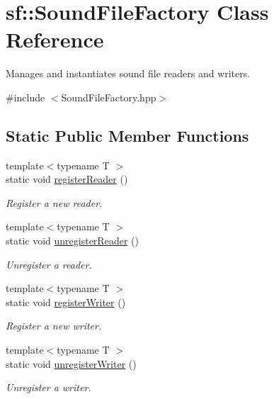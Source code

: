 \hypertarget{classsf_1_1_sound_file_factory}{}\section{sf\+:\+:Sound\+File\+Factory Class Reference}
\label{classsf_1_1_sound_file_factory}


Manages and instantiates sound file readers and writers.  




{\ttfamily \#include $<$Sound\+File\+Factory.\+hpp$>$}

\subsection*{Static Public Member Functions}
\begin{DoxyCompactItemize}
\item 
{\footnotesize template$<$typename T $>$ }\\static void \hyperlink{classsf_1_1_sound_file_factory_acaf1f0bf1b7c7b9988ec76b33e33fe95}{register\+Reader} ()
\begin{DoxyCompactList}\small\item\em Register a new reader. \end{DoxyCompactList}\item 
{\footnotesize template$<$typename T $>$ }\\static void \hyperlink{classsf_1_1_sound_file_factory_a9e6765c41e2784bc755388afb4a2f432}{unregister\+Reader} ()
\begin{DoxyCompactList}\small\item\em Unregister a reader. \end{DoxyCompactList}\item 
{\footnotesize template$<$typename T $>$ }\\static void \hyperlink{classsf_1_1_sound_file_factory_a3a59140e6ccf1f252f721b790eddd661}{register\+Writer} ()
\begin{DoxyCompactList}\small\item\em Register a new writer. \end{DoxyCompactList}\item 
{\footnotesize template$<$typename T $>$ }\\static void \hyperlink{classsf_1_1_sound_file_factory_a2306f90d1f72e474732e4bcceeb34215}{unregister\+Writer} ()
\begin{DoxyCompactList}\small\item\em Unregister a writer. \end{DoxyCompactList}\item 

\end{DoxyCompactItemize}
